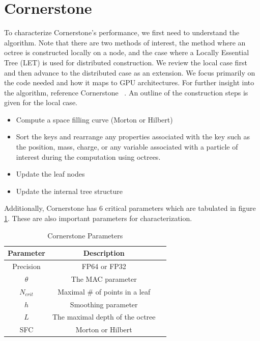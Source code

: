\section{Cornerstone}
\label{sec:cornerstone}

To characterize Cornerstone's performance, we first need to understand the algorithm. Note that there are two methods of interest, the method where an octree is constructed locally on a node, and the case where a Locally Essential Tree (LET) is used for distributed construction. We review the local case first and then advance to the distributed case as an extension. We focus primarily on the code needed and how it maps to GPU architectures. For further insight into the algorithm, reference Cornerstone ~\cite{cornerstone}. An outline of the construction steps is given for the local case.
\begin{itemize}
    \item Compute a space filling curve (Morton or Hilbert)
    \item Sort the keys and rearrange any properties associated with the key such as the position, mass, charge, or any variable associated with a particle of interest during the computation using octrees.
    \item Update the leaf nodes
    \item Update the internal tree structure
\end{itemize}

Additionally, Cornerstone has 6 critical parameters which are tabulated in figure \ref{tab:cs_params}. These are also important parameters for characterization.

\begin{table}[h!]
    \centering
    \caption{Cornerstone Parameters}
    \label{tab:cs_params}
    \begin{tabular}{|c|c|c|}
        \hline
        \textbf{Parameter} & \textbf{Description} \\
        \hline
        Precision & FP64 or FP32 \\
        $\theta$ & The MAC parameter \\
        $N_{crit}$ & Maximal \# of points in a leaf \\ 
        $h$ & Smoothing parameter \\
        $L$ & The maximal depth of the octree \\
        SFC & Morton or Hilbert \\
        \hline
    \end{tabular}
\end{table}

